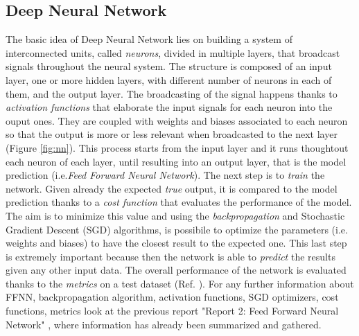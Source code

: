 \documentclass[english,notitlepage,reprint,nofootinbib]{revtex4-1}  %
\begin{document}
\subsection{Deep Neural Network}

The basic idea of Deep Neural Network lies on building a system of interconnected units, called \textit{neurons}, divided in multiple layers, that broadcast signals throughout the neural system. The structure is composed of an input layer, one or more hidden layers, with different number of neurons in each of them, and the output layer. The broadcasting of the signal happens thanks to \textit{activation functions} that elaborate the input signals for each neuron into the ouput ones. They are coupled with weights and biases associated to each neuron so that the output is more or less relevant when broadcasted to the next layer (Figure \ref{fig:nn}). This process starts from the input layer and it runs thoughtout each neuron of each layer, until resulting into an output layer, that is the model prediction (i.e.\textit{Feed Forward Neural Network}). The next step is to \textit{train} the network. Given already the expected \textit{true} output, it is compared to the model prediction thanks to a \textit{cost function} that evaluates the performance of the model. The aim is to minimize this value and using the \textit{backpropagation} and Stochastic Gradient Descent (SGD) algorithms, is possibile to optimize the parameters (i.e. weights and biases) to have the closest result to the expected one. This last step is extremely important because then the network is able to \textit{predict} the results given any other input data. The overall performance of the network is evaluated thanks to the \textit{metrics} on a test dataset (Ref. \cite{mortens}). For any further information about FFNN, backpropagation algorithm, activation functions, SGD optimizers, cost  functions, metrics look at the previous report "Report 2: Feed Forward Neural Network" \cite{adele}, where information has already been summarized and gathered.
\end{document}

